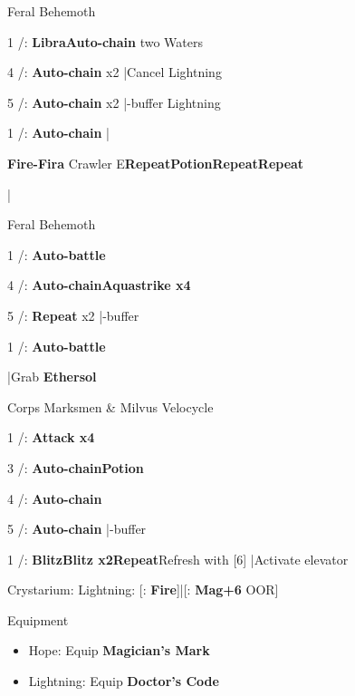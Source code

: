 \begin{fight}{Feral Behemoth}
	\item [1] \rav/\com: \textbf{Libra}\to \textbf{Auto-chain} two Waters
	\item [4] \rav/\rav: \textbf{Auto-chain} x2 |Cancel Lightning
	\item [5] \rav/\rav: \textbf{Auto-chain} x2 |\com-buffer Lightning
	\item [1] \rav/\com: \textbf{Auto-chain} |\skip
\end{fight}
\begin{mainlist}
	\item {} \textbf{Fire-Fira} Crawler E\to [6] \textbf{Repeat}\to \textbf{\textbf{Potion}}\to \textbf{Repeat}\to [1] \textbf{Repeat}
	\item {}|
\end{mainlist}
\begin{fight}{Feral Behemoth}
	\item [1] \com/\rav: \textbf{Auto-battle}
	\item [4] \rav/\rav: \textbf{Auto-chain}\to \textbf{Aquastrike x4}
	\item [5] \rav/\rav: \textbf{Repeat} x2 |\com-buffer
	\item [1] \com/\rav: \textbf{Auto-battle}
\end{fight}
\begin{mainlist}
	\item \skip|Grab \textbf{Ethersol}
\end{mainlist}
\begin{fight}{Corps Marksmen \& Milvus Velocycle}
	\item [1] \com/\rav: \textbf{Attack x4}
	\item [3] \rav/\syn: \textbf{Auto-chain}\to \textbf{\textbf{Potion}}
	\item [4] \rav/\rav: \textbf{Auto-chain}
	\item [5] \rav/\rav: \textbf{Auto-chain} |\com-buffer
	\item [1] \com/\rav: \textbf{Blitz}\to \textbf{Blitz x2}\to \textbf{Repeat}\to Refresh with [6] |Activate elevator
\end{fight}
\begin{menu}
	\item Crystarium: Lightning: [\rav: \textbf{Fire}]|[\com: \textbf{Mag+6} OOR]
	\item Equipment
	\begin{itemize}
		\item Hope: Equip \textbf{Magician's Mark}
		\item Lightning: Equip \textbf{Doctor's Code}
	\end{itemize}
\end{menu}
